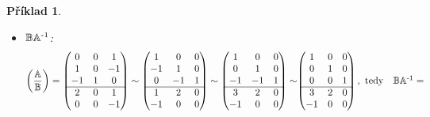 \documentclass[12pt]{article}
\newtheorem{expl}[theorem]{Příklad}
\begin{document}
\pagebreak
\begin{expl}
\thispagestyle{empty}
\begin{itemize}
\item $\mathbb{B}\mathbb{A}^{\text{\normalfont{-1}}}$:
\vspace*{5ex}
\[\left(\frac{\mathbb{A}}{\mathbb{B}} \right)
=
\begin{pmatrix}
0 & 0 & 1 \\
1 & 0& -1 \\
-1 & 1 & 0 \\ \hline
2 & 0 & 1 \\
0 & 0 & -1  
\end{pmatrix}
\sim 
\begin{pmatrix}
1 & 0 & 0 \\
-1 & 1 & 0 \\
0 & -1 & 1 \\\hline
1 & 2 & 0\\
-1 & 0 & 0
\end{pmatrix}
\sim
\begin{pmatrix}
1 & 0 & 0 \\
0 & 1 & 0 \\
-1 & -1 & 1\\ \hline
3 & 2 & 0 \\
-1 & 0 & 0
\end{pmatrix}
\sim 
$$
$$
\begin{pmatrix}
1 & 0 & 0 \\
0 &1 & 0 \\
0 & 0 & 1 \\ \hline
3 & 2 & 0 \\
-1& 0 & 0 \\
\end{pmatrix}, \text{ tedy} \quad \mathbb{B}\mathbb{A}^{\text{\normalfont{-1}}} = 
\]
\end{itemize}
\end{expl}
\end{document}
